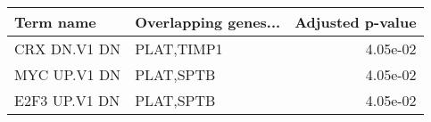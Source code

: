 \begin{tabular}{llr}
\toprule
    Term name & Overlapping genes... &  Adjusted p-value \\
\midrule
 CRX DN.V1 DN &           PLAT,TIMP1 &          4.05e-02 \\
 MYC UP.V1 DN &            PLAT,SPTB &          4.05e-02 \\
E2F3 UP.V1 DN &            PLAT,SPTB &          4.05e-02 \\
\bottomrule
\end{tabular}
